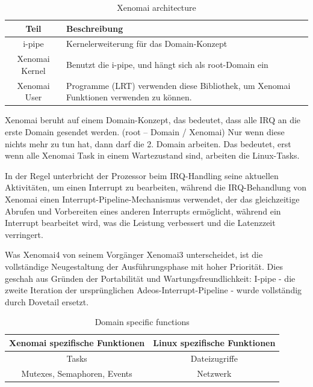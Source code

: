 \documentclass[MMR,Master,english]{twbook}
\begin{document}
\begin{table}[!h]
	\centering
	\caption[Xenomai architecture]{Xenomai architecture}
	\label{tab:what_is_xenomai}
	\setlength{\tabcolsep}{0.5em} %
	{\renewcommand{\arraystretch}{1.2}%
		\begin{tabular}{|c|p{}|}
			\hline
			\textbf{Teil}  & \textbf{Beschreibung}                                                                  \\ \hline
			i-pipe         & Kernelerweiterung für das Domain-Konzept                                               \\ \hline
			Xenomai Kernel & Benutzt die i-pipe, und hängt sich als root-Domain ein                                 \\ \hline
			Xenomai User   & Programme (LRT) verwenden diese Bibliothek, um Xenomai Funktionen verwenden zu können. \\ \hline
		\end{tabular}}
\end{table}


\noindent Xenomai beruht auf einem Domain-Konzept, das bedeutet, dass alle IRQ an die erste Domain gesendet werden. (root – Domain / Xenomai)
Nur wenn diese nichts mehr zu tun hat, dann darf die 2. Domain arbeiten.
Das bedeutet, erst wenn alle Xenomai Task in einem Wartezustand sind, arbeiten die Linux-Tasks.

\noindent In der Regel unterbricht der Prozessor beim IRQ-Handling seine aktuellen Aktivitäten, um einen Interrupt zu bearbeiten, während die IRQ-Behandlung von Xenomai einen Interrupt-Pipeline-Mechanismus verwendet, der das gleichzeitige Abrufen und Vorbereiten eines anderen Interrupts ermöglicht, während ein Interrupt bearbeitet wird, was die Leistung verbessert und die Latenzzeit verringert.

\noindent Was Xenomai4 von seinem Vorgänger Xenomai3 unterscheidet, ist die vollständige Neugestaltung der Ausführungsphase mit hoher Priorität. Dies geschah aus Gründen der Portabilität und Wartungsfreundlichkeit: I-pipe - die zweite Iteration der ursprünglichen Adeos-Interrupt-Pipeline - wurde vollständig durch Dovetail ersetzt.

\begin{table}[H]
	\centering
	\caption[Domain specific functions]{Domain specific functions}
	\label{tab:domain_specific_functions}
	\begin{tabular}{|c|c|}
		\hline
		\textbf{Xenomai spezifische Funktionen} & \textbf{Linux spezifische Funktionen} \\ \hline
		Tasks                                   & Dateizugriffe                         \\ \hline
		Mutexes, Semaphoren, Events             & Netzwerk                              \\ \hline
	\end{tabular}
\end{table}
\end{document}
